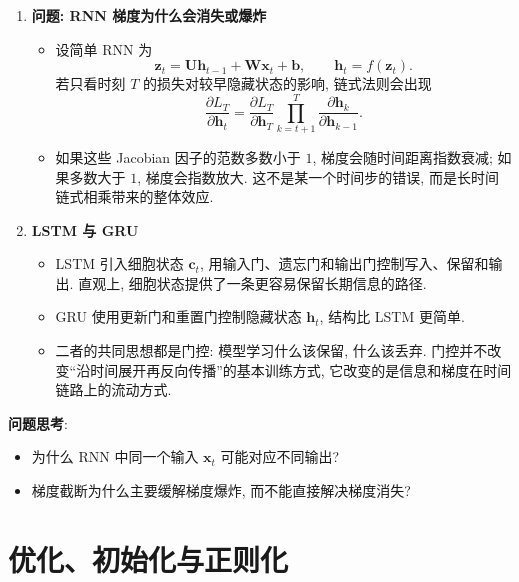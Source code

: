 \documentclass{../nndlcourse}
\begin{document}
\begin{enumerate}
    \item \textbf{问题: RNN 梯度为什么会消失或爆炸}
    \begin{itemize}
        \item 设简单 RNN 为
        \[
            \boldsymbol{z}_t
            =
            \boldsymbol{U}\boldsymbol{h}_{t-1}
            +
            \boldsymbol{W}\boldsymbol{x}_t
            +
            \boldsymbol{b},
            \qquad
            \boldsymbol{h}_t=f(\boldsymbol{z}_t).
        \]
        若只看时刻 $T$ 的损失对较早隐藏状态的影响, 链式法则会出现
        \[
            \frac{\partial L_T}{\partial \boldsymbol{h}_t}
            =
            \frac{\partial L_T}{\partial \boldsymbol{h}_T}
            \prod_{k=t+1}^{T}
            \frac{\partial \boldsymbol{h}_k}{\partial \boldsymbol{h}_{k-1}}.
        \]
        \item 如果这些 Jacobian 因子的范数多数小于 $1$, 梯度会随时间距离指数衰减; 如果多数大于 $1$, 梯度会指数放大. 这不是某一个时间步的错误, 而是长时间链式相乘带来的整体效应.
    \end{itemize}

    \item \textbf{LSTM 与 GRU}
    \begin{itemize}
        \item LSTM 引入细胞状态 $\boldsymbol{c}_t$, 用输入门、遗忘门和输出门控制写入、保留和输出. 直观上, 细胞状态提供了一条更容易保留长期信息的路径.
        \item GRU 使用更新门和重置门控制隐藏状态 $\boldsymbol{h}_t$, 结构比 LSTM 更简单.
        \item 二者的共同思想都是门控: 模型学习什么该保留, 什么该丢弃. 门控并不改变“沿时间展开再反向传播”的基本训练方式, 它改变的是信息和梯度在时间链路上的流动方式.
    \end{itemize}

\end{enumerate}

\textbf{问题思考}:
\begin{itemize}
    \item 为什么 RNN 中同一个输入 $\boldsymbol{x}_t$ 可能对应不同输出?
    \item 梯度截断为什么主要缓解梯度爆炸, 而不能直接解决梯度消失?
\end{itemize}

\section{优化、初始化与正则化}
\end{document}
